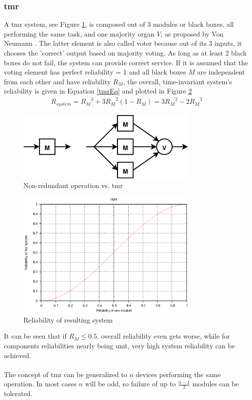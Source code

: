 \subsubsection{\gls{tmr}}
A \gls{tmr} system, see Figure \ref{fig:tmr}, is composed out of 3 modules or black boxes, all performing the same task,	
and one majority organ $V$, as proposed by Von Neumann \cite{vN56}. The latter element
is also called voter because out of its 3 inputs, it chooses the 'correct' output based on majority voting. As long as at least 2 black boxes do not
fail, the system can provide correct service. If it is assumed that the voting element has perfect reliability = 1 and all black boxes $M$ are independent from
each other and have reliability $R_M$, the overall, time-invariant system's reliability is given in Equation \ref{tmrEq} \cite{Lyons:1962:UTR:1661979.1661984} and plotted in Figure \ref{fig:tmrGrp}
\begin{align}\label{tmrEq}
 R_{system} = {R_M}^3 + 3{R_M}^2(1-R_M) = 3{R_M}^2 - 2{R_M}^3
\end{align}
\begin{figure}
    \centering
    \includegraphics[width=0.8\textwidth]{figures/tmr.eps}
    \caption{Non-redundant operation vs. \gls{tmr}}
    \label{fig:tmr}
\end{figure}
\begin{figure}
    \centering
    \includegraphics[width=0.8\textwidth]{figures/tmrGraph2.eps}
    \caption{Reliability of resulting system}
    \label{fig:tmrGrp}
\end{figure}
It can be seen that if $R_M \leq 0.5$, overall reliability even gets worse, while for components reliabilities nearly being unit, very high system reliability can
be achieved.
\\
\\
The concept of \gls{tmr} can be generalized to $n$ devices performing
the same operation. In most cases $n$ will be odd, so failure of up to $\frac{n-1}{2}$ modules can be tolerated.

